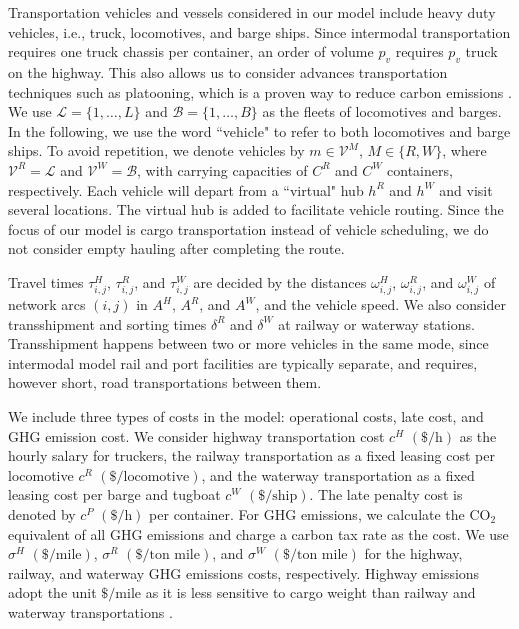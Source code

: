\documentclass[12pt]{article}
\numberwithin{equation}{section}
\begin{document}
	Transportation vehicles and vessels considered in our model include heavy duty vehicles, i.e., truck, locomotives, and barge ships. Since intermodal transportation requires one truck chassis per container, an order of volume $p_v$ requires $p_v$ truck on the highway. This also allows us to consider advances transportation techniques such as platooning, which is a proven way to reduce carbon emissions \parencite{XXX}. We use $\mathcal{L}=\{1, \dots, L\}$ and $\mathcal{B}=\{1, \dots, B\}$ as the fleets of locomotives and barges. In the following, we use the word ``vehicle" to refer to both locomotives and barge ships. To avoid repetition, we denote vehicles by $m\in \mathcal{V}^M$, $M\in \{R, W\}$, where $\mathcal{V}^R=\mathcal{L}$ and $\mathcal{V}^W=\mathcal{B}$, with carrying capacities of $C^R$ and $C^W$ containers, respectively. Each vehicle will depart from a ``virtual" hub $h^R$ and $h^W$ and visit several locations. The virtual hub is added to facilitate vehicle routing. Since the focus of our model is cargo transportation instead of vehicle scheduling, we do not consider empty hauling after completing the route.
	
	Travel times $\tau^H_{i, j}$, $\tau^R_{i, j}$, and $\tau^W_{i, j}$ are decided by the distances $\omega^H_{i, j}$, $\omega^R_{i, j}$, and $\omega^W_{i, j}$ of network arcs $(i, j)$ in $A^H$, $A^R$, and $A^W$, and the vehicle speed. We also consider transshipment and sorting times $\delta^R$ and $\delta^W$ at railway or waterway stations. Transshipment happens between two or more vehicles in the same mode, since intermodal model rail and port facilities are typically separate, and requires, however short, road transportations between them.
	
	We include three types of costs in the model: operational costs, late cost, and GHG emission cost. We consider highway transportation cost $c^H$ $(\$/\text{h})$ as the hourly salary for truckers, the railway transportation as a fixed leasing cost per locomotive $c^R$ $(\$/\text{locomotive})$, and the waterway transportation as a fixed leasing cost per barge and tugboat $c^W$ $(\$/\text{ship})$. The late penalty cost is denoted by $c^P$ $(\$/\text{h})$ per container. For GHG emissions, we calculate the $\text{CO}_2$ equivalent of all GHG emissions and charge a carbon tax rate as the cost. We use $\sigma^H$ $(\$/\text{mile})$, $\sigma^R$ $(\$/\text{ton mile})$, and $\sigma^W$ $(\$/\text{ton mile})$ for the highway, railway, and waterway GHG emissions costs, respectively. Highway emissions adopt the unit $\$/\text{mile}$ as it is less sensitive to cargo weight than railway and waterway transportations \parencite{XXX}.
	
\end{document}
